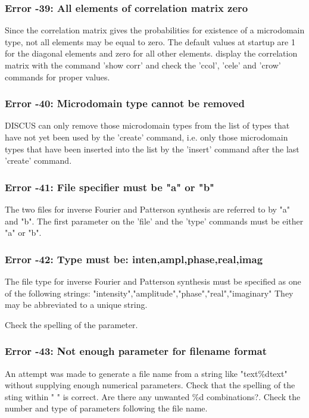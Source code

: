 \subsubsection{Error -39: All elements of correlation matrix zero}
\par
Since the correlation matrix gives the probabilities for existence 
of a microdomain type, not all elements may be equal to zero. The 
default values at startup are 1 for the diagonal elements and zero 
for all other elements. display the correlation matrix with the 
command 'show corr' and check the 'ccol', 'cele' and 'crow' commands 
for proper values. 
\subsubsection{Error -40: Microdomain type cannot be removed}
\par
DISCUS can only remove those microdomain types from the list of types 
that have not yet been used by the 'create' command, i.e. only those 
microdomain types that have been inserted into the list by the 'insert' 
command after the last 'create' command. 
\subsubsection{Error -41: File specifier must be "a" or "b"}
\par
The two files for inverse Fourier and Patterson synthesis are 
referred to by "a" and "b". The first parameter on the 'file' and 
the 'type' commands must be either "a" or "b". 
\subsubsection{Error -42: Type must be: inten,ampl,phase,real,imag}
\par
The file type for inverse Fourier and Patterson synthesis must be 
specified as one of the following strings: 
"intensity","amplitude","phase","real","imaginary" 
They may be abbreviated to a unique string. 
\par
Check the spelling of the parameter. 
\subsubsection{Error -43: Not enough parameter for filename format}
\par
An attempt was made to generate a file name from a string like 
"text\%dtext" without supplying enough numerical parameters. 
Check that the spelling of the sting within " " is correct. Are 
there any unwanted \%d combinations?. Check the number and type 
of parameters following the file name. 
